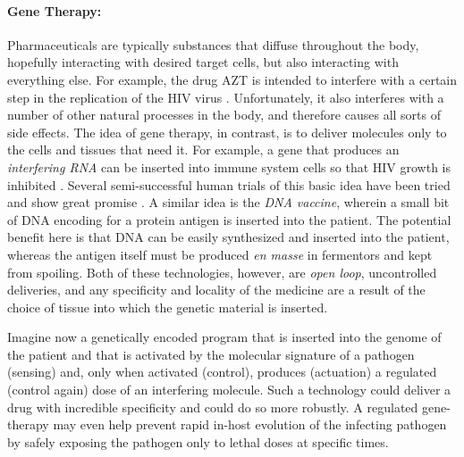 
\paragraph{Gene Therapy:} Pharmaceuticals are typically substances
that diffuse throughout the body, hopefully interacting with desired
target cells, but also interacting with everything else. For example,
the drug AZT is intended to interfere with a certain step in the
replication of the HIV virus \cite{azt}. Unfortunately, it also
interferes with a number of other natural processes in the body, and
therefore causes all sorts of side effects. The idea of gene therapy,
in contrast, is to deliver molecules only to the cells and tissues
that need it. For example, a gene that produces an {\em interfering
  RNA} can be inserted into immune system cells so that HIV growth is
inhibited \cite{hiv-gene-therapy}. Several semi-successful human
trials of this basic idea have been tried and show great promise
\cite{gene-therapy-trials}. A similar idea is the {\em DNA vaccine},
wherein a small bit of DNA encoding for a protein antigen is inserted
into the patient. The potential benefit here is that DNA can be easily
synthesized and inserted into the patient, whereas the antigen itself
must be produced {\em en masse} in fermentors and kept from
spoiling. Both of these technologies, however, are {\em open loop},
uncontrolled deliveries, and any specificity and locality of the
medicine are a result of the choice of tissue into which the genetic
material is inserted.

Imagine now a genetically encoded program that is inserted into the
genome of the patient and that is activated by the molecular signature
of a pathogen (sensing) and, only when activated (control), produces
(actuation) a regulated (control again) dose of an interfering
molecule. Such a technology could deliver a drug with incredible
specificity and could do so more robustly. A regulated gene-therapy may
even help prevent rapid in-host evolution of the infecting pathogen by
safely exposing the pathogen only to lethal doses at specific times.

